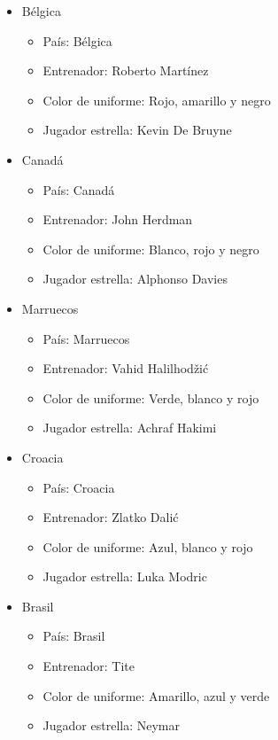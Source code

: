 \begin{itemize}
\begin{itemize}
        \end{itemize}
    \item Bélgica
        \begin{itemize}
            \item País: Bélgica
            \item Entrenador: Roberto Martínez
            \item Color de uniforme: Rojo, amarillo y negro
            \item Jugador estrella: Kevin De Bruyne
        \end{itemize}
    \item Canadá
        \begin{itemize}
            \item País: Canadá
            \item Entrenador: John Herdman
            \item Color de uniforme: Blanco, rojo y negro
            \item Jugador estrella: Alphonso Davies
        \end{itemize}
    \item Marruecos
        \begin{itemize}
            \item País: Marruecos
            \item Entrenador: Vahid Halilhodžić
            \item Color de uniforme: Verde, blanco y rojo
            \item Jugador estrella: Achraf Hakimi
        \end{itemize}
    \item Croacia
        \begin{itemize}
            \item País: Croacia
            \item Entrenador: Zlatko Dalić
            \item Color de uniforme: Azul, blanco y rojo
            \item Jugador estrella: Luka Modric
        \end{itemize}
    \item Brasil
        \begin{itemize}
            \item País: Brasil
            \item Entrenador: Tite
            \item Color de uniforme: Amarillo, azul y verde
            \item Jugador estrella: Neymar

\end{itemize}
\end{itemize}
